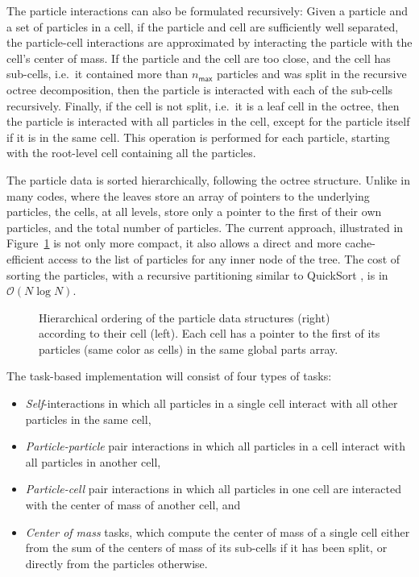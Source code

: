 \documentclass[preprint]{elsarticle}
\newcommand{\oh}[1]
    {\mbox{$ {\mathcal O}( #1 ) $}}
\newcommand{\fig}[1]
    {Figure~\ref{fig:#1}}
\begin{document}
The particle interactions can also be formulated recursively:
Given a particle and a set of particles in a cell,
if the particle and cell
are sufficiently well separated, the particle-cell interactions
are approximated by interacting the particle with the cell's
center of mass.
If the particle and the cell are too close, and the cell
has sub-cells, i.e.~it contained more than $n_\mathsf{max}$
particles and was split in the recursive octree decomposition,
then the particle is interacted with each of the sub-cells
recursively.
Finally, if the cell is not split, i.e.~it is a leaf cell
in the octree, then the particle is interacted with all
particles in the cell, except for the particle itself if
it is in the same cell.
This operation is performed for each particle, starting
with the root-level cell containing all the particles.

The particle data is sorted hierarchically, following the
octree structure.
Unlike in many codes, where the leaves store an array of
pointers to the underlying particles, the cells, at all
levels, store only a pointer to the first of their own particles,
and the total number of particles.
The current approach, illustrated in \fig{CellParts} is not
only more compact, it also allows a direct and more cache-efficient access
to the list of particles for any inner node of the tree.
The cost of sorting the particles, with a recursive
partitioning similar to QuickSort \cite{ref:Hoare1962},
is in \oh{N\log N}.

\begin{figure}
    \centerline{}
    \caption{Hierarchical ordering of the particle data structures
    (right) according to their cell (left).
    Each cell has a pointer to the first of its particles (same color
    as cells) in the same global parts array.}
    \label{fig:CellParts}
\end{figure}

The task-based implementation will consist of four
types of tasks:
\begin{itemize}
    \item {\em Self}-interactions in which all particles
        in a single cell interact with all other particles in the
        same cell,
    \item {\em Particle-particle} pair interactions in which
        all particles in a cell interact with all
        particles in another cell,
    \item {\em Particle-cell} pair interactions in which
        all particles in one cell are interacted with the
        center of mass of another cell, and
    \item {\em Center of mass} tasks, which compute
        the center of mass of a single cell either from
        the sum of the centers of mass of its sub-cells
        if it has been split, or directly from the
        particles otherwise.
\end{itemize}
\end{document}
